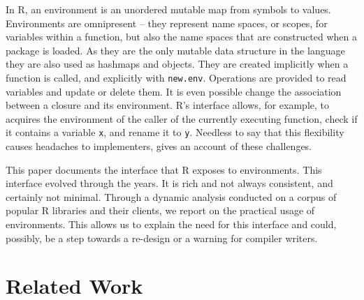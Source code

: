 \documentclass[10pt,sigplan,authorversion=true]{acmart}
\renewcommand{\c}[1]{\lstinline |#1|\xspace}
\begin{document}
In R, an environment is an unordered mutable map from symbols to values.
Environments are omnipresent -- they represent name spaces, or scopes, for
variables within a function, but also the name spaces that are constructed when
a package is loaded. As they are the only mutable data structure in the language
they are also used as hashmaps and objects. They are created implicitly when a
function is called, and explicitly with \c{new.env}. Operations are provided to
read variables and update or delete them. It is even possible change the
association between a closure and its environment. R's interface allows, for
example, to acquires the environment of the caller of the currently executing
function, check if it contains a variable \c{x}, and rename it to \c{y}.
Needless to say that this flexibility causes headaches to implementers,
\citet{dls19} gives an account of these challenges.

This paper documents the interface that R exposes to environments. This
interface evolved through the years. It is rich and not always consistent, and
certainly not minimal. Through a dynamic analysis conducted on a corpus of
popular R libraries and their clients, we report on the practical usage of
environments. This allows us to explain the need for this interface and could,
possibly, be a step towards a re-design or a warning for compiler writers.

\newpage

\section{Related Work}
\end{document}
